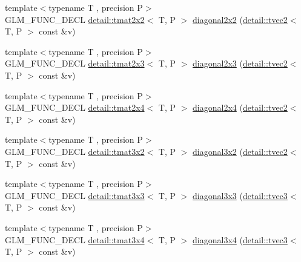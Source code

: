 \begin{DoxyCompactItemize}
\item 
{\footnotesize template$<$typename T , precision P$>$ }\\G\+L\+M\+\_\+\+F\+U\+N\+C\+\_\+\+D\+E\+CL \hyperlink{structglm_1_1detail_1_1tmat2x2}{detail\+::tmat2x2}$<$ T, P $>$ \hyperlink{group__gtx__matrix__operation_gae4177a43a89e6b4b7352f82198f2ea84}{diagonal2x2} (\hyperlink{structglm_1_1detail_1_1tvec2}{detail\+::tvec2}$<$ T, P $>$ const \&v)
\item 
{\footnotesize template$<$typename T , precision P$>$ }\\G\+L\+M\+\_\+\+F\+U\+N\+C\+\_\+\+D\+E\+CL \hyperlink{structglm_1_1detail_1_1tmat2x3}{detail\+::tmat2x3}$<$ T, P $>$ \hyperlink{group__gtx__matrix__operation_ga873468c41cb29fb84a12a866549e0136}{diagonal2x3} (\hyperlink{structglm_1_1detail_1_1tvec2}{detail\+::tvec2}$<$ T, P $>$ const \&v)
\item 
{\footnotesize template$<$typename T , precision P$>$ }\\G\+L\+M\+\_\+\+F\+U\+N\+C\+\_\+\+D\+E\+CL \hyperlink{structglm_1_1detail_1_1tmat2x4}{detail\+::tmat2x4}$<$ T, P $>$ \hyperlink{group__gtx__matrix__operation_gaf97e094855cc3c6186b879d045f67aca}{diagonal2x4} (\hyperlink{structglm_1_1detail_1_1tvec2}{detail\+::tvec2}$<$ T, P $>$ const \&v)
\item 
{\footnotesize template$<$typename T , precision P$>$ }\\G\+L\+M\+\_\+\+F\+U\+N\+C\+\_\+\+D\+E\+CL \hyperlink{structglm_1_1detail_1_1tmat3x2}{detail\+::tmat3x2}$<$ T, P $>$ \hyperlink{group__gtx__matrix__operation_gabf8e8445e2884aeaa35f0ec32ba5bd01}{diagonal3x2} (\hyperlink{structglm_1_1detail_1_1tvec2}{detail\+::tvec2}$<$ T, P $>$ const \&v)
\item 
{\footnotesize template$<$typename T , precision P$>$ }\\G\+L\+M\+\_\+\+F\+U\+N\+C\+\_\+\+D\+E\+CL \hyperlink{structglm_1_1detail_1_1tmat3x3}{detail\+::tmat3x3}$<$ T, P $>$ \hyperlink{group__gtx__matrix__operation_gaa49be0f424ad2f3015c5945c13a5fad0}{diagonal3x3} (\hyperlink{structglm_1_1detail_1_1tvec3}{detail\+::tvec3}$<$ T, P $>$ const \&v)
\item 
{\footnotesize template$<$typename T , precision P$>$ }\\G\+L\+M\+\_\+\+F\+U\+N\+C\+\_\+\+D\+E\+CL \hyperlink{structglm_1_1detail_1_1tmat3x4}{detail\+::tmat3x4}$<$ T, P $>$ \hyperlink{group__gtx__matrix__operation_gab96c533557a191bd972300868f8111ef}{diagonal3x4} (\hyperlink{structglm_1_1detail_1_1tvec3}{detail\+::tvec3}$<$ T, P $>$ const \&v)
\item 

\end{DoxyCompactItemize}
